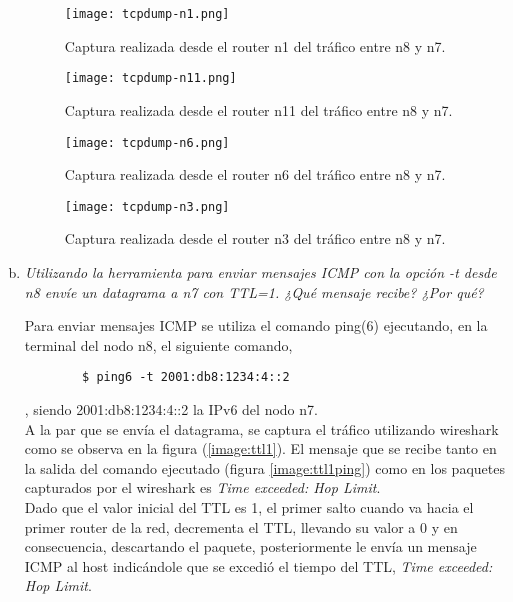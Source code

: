 \documentclass[osajnl,twocolumn,showpacs,superscriptaddress,10pt]{revtex4-1} %
\begin{document}
\begin{enumerate}[a)]
    \begin{figure}[H]
        \centering
        \texttt{[image: tcpdump-n1.png]}
        \caption{Captura realizada desde el router n1 del tráfico entre n8 y n7.}
        \label{image:tcpdump-n1}
    \end{figure}

    \begin{figure}[H]
        \centering
        \texttt{[image: tcpdump-n11.png]}
        \caption{Captura realizada desde el router n11 del tráfico entre n8 y n7.}
        \label{image:tcpdump-n11}
    \end{figure}

    \begin{figure}[H]
        \centering
        \texttt{[image: tcpdump-n6.png]}
        \caption{Captura realizada desde el router n6 del tráfico entre n8 y n7.}
        \label{image:tcpdump-n6}
    \end{figure}

    \begin{figure}[H]
        \centering
        \texttt{[image: tcpdump-n3.png]}
        \caption{Captura realizada desde el router n3 del tráfico entre n8 y n7.}
        \label{image:tcpdump-n3}
    \end{figure}

    \item \textit{Utilizando la herramienta para enviar mensajes ICMP con la opción
    -t desde n8 envíe un datagrama a n7 con TTL=1. ¿Qué mensaje recibe? ¿Por qué?}

    Para enviar mensajes ICMP se utiliza el comando ping(6) ejecutando, en la 
    terminal del nodo n8, el siguiente comando,

    \begin{verbatim}
        $ ping6 -t 2001:db8:1234:4::2
    \end{verbatim}

    , siendo 2001:db8:1234:4::2 la IPv6 del nodo n7. \\

    A la par que se envía el datagrama, se captura el tráfico utilizando wireshark
    como se observa en la figura (\ref{image:ttl1}). El mensaje que se recibe tanto en la
    salida del comando ejecutado (figura \ref{image:ttl1ping}) como en los paquetes
    capturados por el wireshark es \textit{Time exceeded: Hop Limit}. \\

    Dado que el valor inicial del TTL es 1, el primer salto cuando va hacia el primer router de la red, 
    decrementa el TTL, llevando su valor a 0 y en consecuencia, descartando el paquete, posteriormente 
    le envía un mensaje ICMP al host indicándole que se excedió el tiempo del TTL, \textit{Time exceeded: Hop Limit}.


\end{enumerate}
\end{document}
